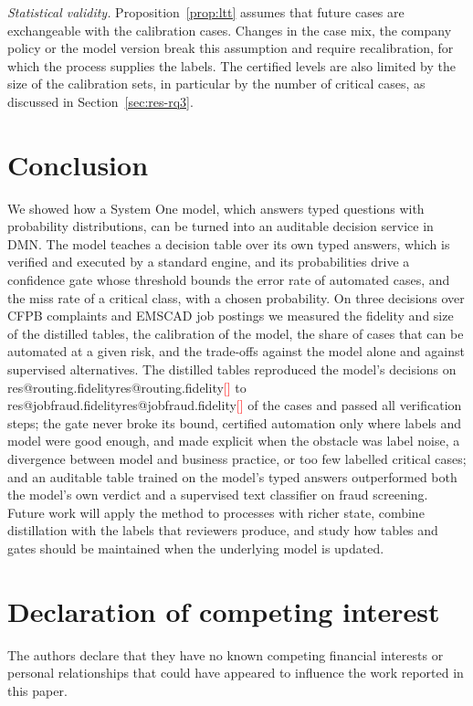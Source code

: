 \documentclass[a4paper,fleqn]{cas-sc}
\makeatletter
\theoremstyle{definition}
\newcommand{\tbd}[1]{\textcolor{red}{[\detokenize{#1}]}}
\newcommand{\res}[1]{\ifcsname res@#1\endcsname\csname res@#1\endcsname\else\tbd{#1}\fi}
\makeatother
\begin{document}
\emph{Statistical validity.} Proposition~\ref{prop:ltt} assumes that future cases are exchangeable with the calibration cases. Changes in the case mix, the company policy or the model version break this assumption and require recalibration, for which the process supplies the labels. The certified levels are also limited by the size of the calibration sets, in particular by the number of critical cases, as discussed in Section~\ref{sec:res-rq3}.

\section{Conclusion}\label{sec:conclusion}
We showed how a System One model, which answers typed questions with probability distributions, can be turned into an auditable decision service in DMN. The model teaches a decision table over its own typed answers, which is verified and executed by a standard engine, and its probabilities drive a confidence gate whose threshold bounds the error rate of automated cases, and the miss rate of a critical class, with a chosen probability. On three decisions over CFPB complaints and EMSCAD job postings we measured the fidelity and size of the distilled tables, the calibration of the model, the share of cases that can be automated at a given risk, and the trade-offs against the model alone and against supervised alternatives.
The distilled tables reproduced the model's decisions on \res{routing.fidelity} to \res{jobfraud.fidelity} of the cases and passed all verification steps; the gate never broke its bound, certified automation only where labels and model were good enough, and made explicit when the obstacle was label noise, a divergence between model and business practice, or too few labelled critical cases; and an auditable table trained on the model's typed answers outperformed both the model's own verdict and a supervised text classifier on fraud screening.
Future work will apply the method to processes with richer state, combine distillation with the labels that reviewers produce, and study how tables and gates should be maintained when the underlying model is updated.

\printcredits

\section*{Declaration of competing interest}
The authors declare that they have no known competing financial interests or personal relationships that could have appeared to influence the work reported in this paper.
\end{document}
